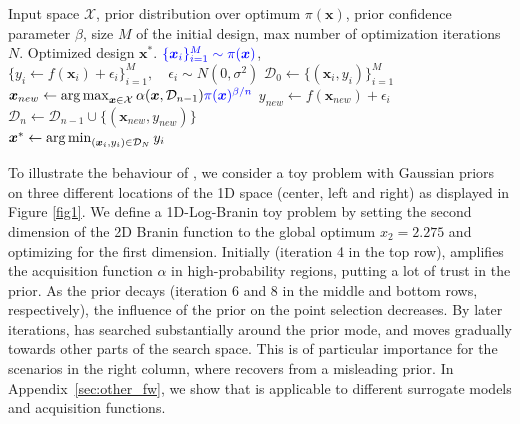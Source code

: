 \documentclass{article}
\newcommand{\frank}[1]{\todo[color=yellow]{Frank: #1}} %
\newcommand{\method}[0]{\text{${\pi}$BO}\xspace}
\newcommand{\pri}[0]{{\pi}}
\begin{document}
\begin{algorithm}[H]
	\caption{\method\;Algorithm} 
	\begin{algorithmic}[1]
	 Input space $\mathcal{X}$, prior distribution over optimum $\pi(\bm{x})$, prior confidence parameter $\beta$, size $M$ of the initial design, max number of optimization iterations $N$.
	 Optimized design $\bm{x}^*$.
	\State $\textcolor{blue}{\{\bm{x}_{i}\}_{i=1}^M \sim \pi(\bm{x})}$, $\{y_i \leftarrow f(\bm{x}_i) + \epsilon_i\}_{i=1}^M, \quad  \epsilon_i \sim N(0, \sigma^2)$ \label{line:init}
	\State $\mathcal{D}_0 \leftarrow \{(\bm{x}_{i}, y_i)\}_{i=1}^M$
        \State $\bm{x}_{new} \leftarrow \argmax_{\bm{x}\in \mathcal{X}}\alpha(\bm{x}, \mathcal{D}_{n-1})\textcolor{blue}{\pri(\bm{x})^{\beta/n}}$ \label{diff} 
        \State $y_{new} \leftarrow f(\bm{x}_{new}) + \epsilon_i$
        \State $\mathcal{D}_{n} \leftarrow \mathcal{D}_{n-1} \cup \{(\bm{x}_{new}, y_{new})\}$
	\EndFor\\
	\Return $\bm{x}^* \leftarrow \mathop{\mathrm{arg\,min}}_{(\bm{x}_i,y_i) \in \mathcal{D}_{N}} y_i$
	\end{algorithmic}
	\label{alg_pibo}
\end{algorithm}

To illustrate the behaviour of \method{}, we consider a toy problem with Gaussian priors on three different locations of the 1D space (center, left and right) as displayed in Figure \ref{fig1}. 
We define a 1D-Log-Branin toy problem by setting the second dimension of the 2D Branin function to
the global optimum $x_2 = 2.275$ and optimizing for the first dimension. Initially (iteration 4 in the top row), \method amplifies the acquisition function $\alpha$ in high-probability regions, putting a lot of trust in the prior.
As the prior decays (iteration 6 and 8 in the middle and bottom rows, respectively), the influence of the prior on the point selection decreases. By later iterations, \method has searched substantially around the prior mode, and moves gradually towards other parts of the search space. This is of particular importance for the scenarios in the right column, where \method recovers from a misleading prior. In Appendix~\ref{sec:other_fw}, we show that \method{} is applicable to different surrogate models and acquisition functions.
\end{document}
